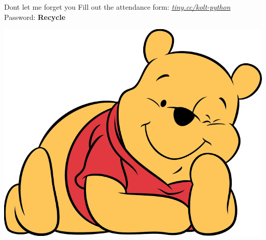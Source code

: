     \begin{frame}{Don\textquotesingle t let me forget you}
        \pause
        \Large
        Fill out the attendance form: \href{https://tiny.cc/kolt-python}{\underline{\textit{tiny.cc/kolt-python}}}\\
        \pause
            Password: \textbf{Recycle}
        \pause
        \begin{center}
            \includegraphics[height=0.60\textheight]{images/winnie.jpg}                
        \end{center}
    \end{frame}

